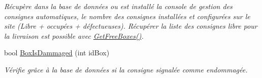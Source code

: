 \begin{DoxyCompactItemize}
\begin{DoxyCompactList}\small\item\em Récupère dans la base de données ou est installé la console de gestion des consignes automatiques, le nombre des consignes installées et configurées sur le site (Libre + occupées + défectueuses). Récupérer la liste des consignes libre pour la livraison est possible avec \hyperlink{class_c_s_q_lite___local___d_b_a33f1aa3666a7af30e1cc36b228fb59fe}{Get\+Free\+Boxes()}. \end{DoxyCompactList}\item 
bool \hyperlink{class_c_s_q_lite___local___d_b_a4cd7505a856e22890c43d5a68191c2c4}{Box\+Is\+Dammaged} (int id\+Box)
\begin{DoxyCompactList}\small\item\em Vérifie grâce à la base de données si la consigne signalée comme endommagée. \end{DoxyCompactList}\end{DoxyCompactItemize}
